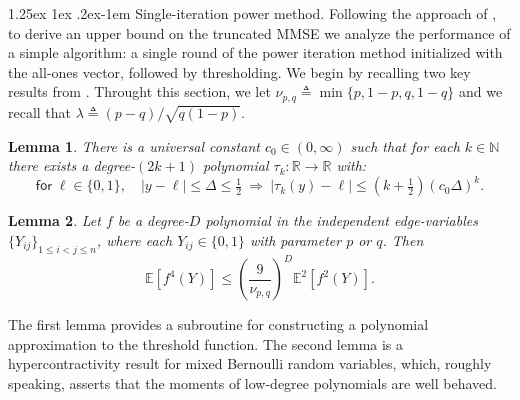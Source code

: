 \documentclass[12pt]{article}
\makeatletter
\newcommand{\bE}{\mathbb{E}}
\newtheorem{lemma}{Lemma}
\newcommand{\p}[1]{\left(#1\right)}
\newcommand{\pp}[1]{\left[#1\right]}
\newcommand{\s}[1]{\mathsf{#1}}
\renewcommand{\paragraph}{%
  \@startsection{paragraph}{4}%
  {\z@}{1.25ex \@plus 1ex \@minus .2ex}{-1em}%
  {\normalfont\normalsize\bfseries}%
}
\makeatother
\begin{document}
\paragraph{Single-iteration power method.} Following the approach of \cite[Sec. 4.2]{SchrammWein2022}, to derive an upper bound on the truncated MMSE we analyze the performance of a simple algorithm: a single round of the power iteration method initialized with the all-ones vector, followed by thresholding. We begin by recalling two key results from \cite{SchrammWein2022}. Throught this section, we let $\nu_{p,q}\triangleq \min\{p,1-p,q,1-q\}$ and we recall that $\lambda\triangleq (p-q)/\sqrt{q(1-p)}$.
\begin{lemma}\cite[Prop. 4.1]{SchrammWein2022}\label{lem:poly-approx}
    There is a universal constant $c_0\in(0,\infty)$ such that for each $k\in\mathbb{N}$ there exists a degree-$(2k+1)$ polynomial $\tau_k:\mathbb{R}\to\mathbb{R}$ with:
\begin{equation}\label{eq:tau-approx}
\s{for}\; \ell\in\{0,1\},\quad |y-\ell|\le\Delta\le\tfrac12\ \Longrightarrow\ 
|\tau_k(y)-\ell|\le(k+\tfrac12)(c_0\Delta)^{k}.
\end{equation}
\end{lemma}
\begin{lemma}\cite[Thm. 4.2]{SchrammWein2022}\label{lem:HC}
Let $f$ be a degree-$D$ polynomial in the independent edge-variables $\{Y_{ij}\}_{1\le i<j\le n}$, where each $Y_{ij}\in\{0,1\}$ with parameter $p$ or $q$. Then
\begin{equation}\label{eq:HC-ineq}
\bE\pp{f^4(Y)}\leq\p{\frac{9}{\nu_{p,q}}}^{D}\bE^2\pp{f^2(Y)}.
\end{equation}
\end{lemma}
The first lemma provides a subroutine for constructing a polynomial approximation to the threshold function. The second lemma is a hypercontractivity result for mixed Bernoulli random variables, which, roughly speaking, asserts that the moments of low-degree polynomials are well behaved.
\end{document}
